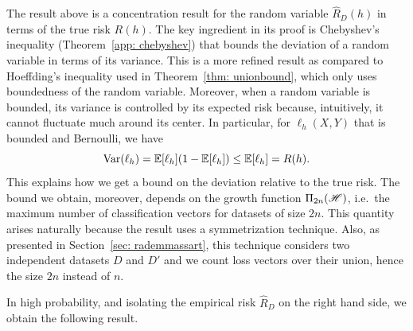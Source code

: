 \documentclass[reqno]{amsart}
\begin{document}
The result above is a concentration result for the random variable $\hat R_D (h)$ in terms of the true risk $R(h)$. The key ingredient in its proof is Chebyshev's inequality (Theorem~\ref{app: chebyshev}) that bounds the deviation of a random variable in terms of its variance. This is a more refined result as compared to Hoeffding's inequality used in Theorem~\ref{thm: unionbound}, which only uses boundedness of the random variable. Moreover, when a random variable is bounded, its variance is controlled by its expected risk because, intuitively, it cannot fluctuate much around its center. In particular, for $\ell_h(X,Y)$ that is bounded and Bernoulli, we have
\[
\operatorname{Var}(\ell_h) = \mathbb{E}[\ell_h](1-\mathbb{E}[\ell_h])\le \mathbb{E}[\ell_h] = R(h).
\]
This explains how we get a bound on the deviation relative to the true risk. 
The bound we obtain, moreover, depends on the growth function $\Pi_{2n}(\mathscr{H})$, i.e.\ the maximum number of classification vectors for datasets of size $2n$. This quantity arises naturally because the result uses a symmetrization technique. Also, as presented in Section~\ref{sec: rademmassart}, this technique considers two independent datasets $D$ and $D'$ and we count loss vectors over their union, hence the size $2n$ instead of $n$. 

In high probability, and isolating the empirical risk $\hat R_D$ on the right hand side, we obtain the following result. 
\end{document}
